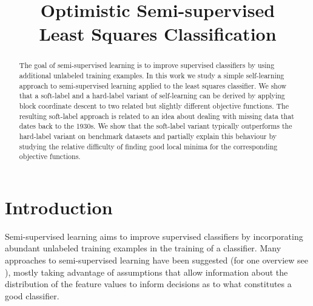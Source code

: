 \documentclass[conference,a4paper,10pt]{IEEEtran}\usepackage[]{graphicx}\usepackage[]{color}
\begin{document}
\title{Optimistic Semi-supervised \\ Least Squares Classification}

\author{
}


\maketitle

\begin{abstract}
The goal of semi-supervised learning is to improve supervised classifiers by using additional unlabeled training examples. In this work we study a simple self-learning approach to semi-supervised learning applied to the least squares classifier. We show that a soft-label and a hard-label variant of self-learning can be derived by applying block coordinate descent to two related but slightly different objective functions. The resulting soft-label approach is related to an idea about dealing with missing data that dates back to the 1930s. We show that the soft-label variant typically outperforms the hard-label variant on benchmark datasets and partially explain this behaviour by studying the relative difficulty of finding good local minima for the corresponding objective functions.
\end{abstract}

\IEEEpeerreviewmaketitle

\section{Introduction}
Semi-supervised learning aims to improve supervised classifiers by incorporating abundant unlabeled training examples in the training of a classifier. Many approaches to semi-supervised learning have been suggested (for one overview see \cite{Chapelle2006}), mostly taking advantage of assumptions that allow information about the distribution of the feature values to inform decisions as to what constitutes a good classifier.
\end{document}
